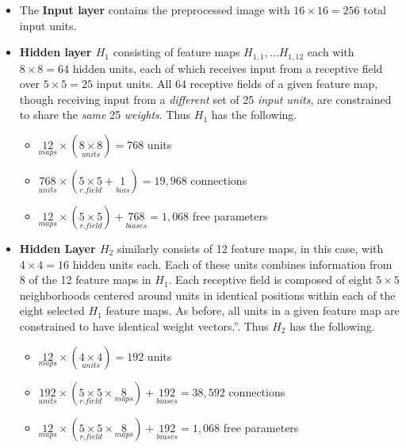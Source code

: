 \documentclass[10pt]{article}
\begin{document}
\begin{itemize}
    \item The \textbf{Input layer} contains the preprocessed image with \(16 \times 16 = 256\) total input units.

    \item \textbf{Hidden layer \(H_{1}\)} consisting of feature maps \(H_{1, 1}, \dots H_{1, 12}\) each with \(8 \times 8 = 64\) hidden units, each of which receives input from a receptive field over \(5 \times 5 = 25\) input units. All 64 receptive fields of a given feature map, though receiving input from a \textit{different} set of 25 \textit{input units}, are constrained to share the \textit{same} 25 \textit{weights}. Thus \(H_1\) has the following.

          \begin{itemize}
              \item \(\underset{maps}{12} \times (\underset{units}{8 \times 8}) = 768\) units
              \item \(\underset{units}{768} \times (\underset{r. field}{5 \times 5} + \underset{bias}{1}) = 19,968\) connections
              \item \(\underset{maps}{12} \times (\underset{r. field}{5 \times 5}) + \underset{biases}{768} = 1,068\) free parameters
          \end{itemize}

    \item \textbf{Hidden Layer \(H_{2}\)} similarly consists of 12 feature maps, in this case, with \(4 \times 4 = 16\) hidden units each. Each of these units combines information from 8 of the 12 feature maps in \(H_1\). Each receptive field is composed of eight \(5\times 5\) neighborhoods centered around units in identical positions within each of the eight selected \(H_1\) feature maps. As before, all units in a given feature map are constrained to have identical weight vectors.''\cite{lecun1998gradient}. Thus \(H_2\) has the following.

          \begin{itemize}
              \item \(\underset{maps}{12} \times (\underset{units}{4 \times 4}) = 192\) units
              \item \(\underset{units}{192} \times (\underset{r. field}{5 \times 5} \times \underset{maps}{8}) + \underset{biases}{192} = 38,592\) connections
              \item \(\underset{maps}{12} \times (\underset{r. field}{5 \times 5} \times \underset{maps}{8}) + \underset{biases}{192} = 1,068\) free parameters
          \end{itemize}


\end{itemize}
\end{document}
